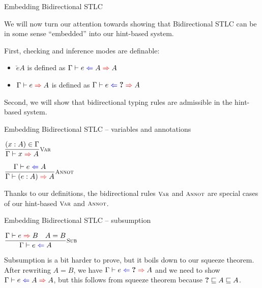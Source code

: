 \documentclass{beamer}
\begin{document}
\begin{frame}{Embedding Bidirectional STLC}

We will now turn our attention towards showing that Bidirectional STLC can be in some sense ``embedded'' into our hint-based system.

\vspace{2em}

First, checking and inference modes are definable:

\begin{itemize}
  \item $\check{e}{A}$ is defined as $\hinting{e}{A}{A}$
  \item $\infer{e}{A}$ is defined as $\hinting{e}{\Hole}{A}$
\end{itemize}

\vspace{2em}

Second, we will show that bidirectional typing rules are admissible in the hint-based system.

\end{frame}

\begin{frame}{Embedding Bidirectional STLC -- variables and annotations}

\begin{center}
  $\infrule[Var]{\sidecond{(x : A) \in \Gamma}}{\infer{x}{A}}$

  \vspace{2em}

  $\infrule[Annot]{\check{e}{A}}{\infer{\annot{e}{A}}{A}}$
\end{center}

\vspace{2em}

Thanks to our definitions, the bidirectional rules $\textsc{\footnotesize{Var}}$ and $\textsc{\footnotesize{Annot}}$ are special cases of our hint-based $\textsc{\footnotesize{Var}}$ and $\textsc{\footnotesize{Annot}}$.

\end{frame}

\begin{frame}{Embedding Bidirectional STLC -- subsumption}

\begin{center}
  $\infrule[Sub]{\infer{e}{B} \quad \sidecond{A = B}}{\check{e}{A}}$
\end{center}

\vspace{2em}

Subsumption is a bit harder to prove, but it boils down to our squeeze theorem. After rewriting $A = B$, we have $\hinting{e}{\Hole}{A}$ and we need to show $\hinting{e}{A}{A}$, but this follows from squeeze theorem because $\textbf{?} \sqsubseteq A \sqsubseteq A$.

\end{frame}
\end{document}
